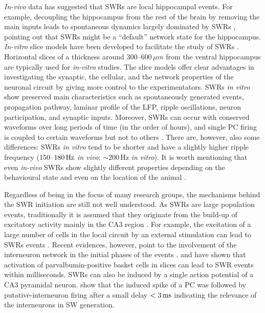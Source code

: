     \textit{In-vivo} data has suggested that SWRs are local hippocampal events.
    For example, decoupling the hippocampus from the rest of the brain by
    removing the main inputs leads to spontaneous dynamics largely dominated by
    SWRs \citep{Buzsaki1983}, pointing out that SWRs might be a ``default''
    network state for the hippocampus. \textit{In-vitro} slice models have been
    developed to facilitate the study of SWRs \cite[e.g.,][]{Maier2002, Maier2003,
    Kubota2003, Colgin2004}. Horizontal slices of a thickness around 300--$600\,
    \mu m$ from the ventral hippocampus are typically used for \textit{in-vitro}
    studies. The slice models offer clear advantages in investigating the
    synaptic, the cellular, and the network properties of the neuronal circuit
    by giving more control to the experimentators. SWRs \textit{in vitro} show
    preserved main characteristics such as spontaneously generated events,
    propagation pathway, laminar profile of the LFP, ripple oscillations,
    neuron participation, and synaptic inputs. Moreover, SWRs can occur with
    conserved waveforms over long periods of time (in the order of hours), and
    single PC firing is coupled to certain waveforms but not to others
    \citep{Reichinnek2010}. There are, however, also some differences: SWRs
    \textit{in vitro} tend to be shorter and have a slightly higher ripple
    frequency (150--$180 \,\rm Hz$ \textit{in vivo}; $\sim 200$\,\rm Hz \textit{in
    vitro}). It is worth mentioning that even \textit{in-vivo} SWRs show
    slightly different properties depending on the behavioural state and even on
    the location of the animal \citep{Buzsaki2015}.
    
    Regardless of being in the focus of many research groups, the mechanisms
    behind the SWR initiation are still not well understood. As SWRs are large
    population events, traditionally it is assumed that they originate from the
    build-up of excitatory activity mainly in the CA3 region
    \citep{delaPrida2006, Ellender2010, Schlingloff2014, Hulse2016}. For
    example, the excitation of a large number of cells in the local circuit by
    an external stimulation can lead to SWRs events \citep{Behrens2005,
    Nimmrich2005, Both2008}. Recent evidences, however, point to the
    involvement of the interneuron network in the initial phases of the events
    \citep{Sasaki2014, Bazelot2016}. \cite{Schlingloff2014} and
    \cite{Kohus2016} have shown that activation of parvalbumin-positive basket
    cells in slices can lead to SWR events within milliseconds. SWRs can also
    be induced by a single action potential of a CA3 pyramidal neuron.
    \cite{Bazelot2016} show that the induced spike of a PC was followed by
    putative-interneuron firing after a small delay $<3\,\rm ms$ indicating the
    relevance of the interneurons in SW generation.

